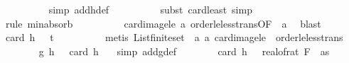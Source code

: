 \begin{isabellebody}
\ \ \ \ \ \ \ \ \isamarkupfalse%
\ {\isacharparenleft}{\kern0pt}simp\ add{\isacharcolon}{\kern0pt}h{\isacharunderscore}{\kern0pt}def{\isacharparenright}{\kern0pt}\isanewline
\ \ \ \ \ \ \ \ \isamarkupfalse%
\ {\isacharparenleft}{\kern0pt}subst\ card{\isacharunderscore}{\kern0pt}least{\isacharcomma}{\kern0pt}\ simp{\isacharparenright}{\kern0pt}\isanewline
\ \ \ \ \ \ \ \ \isamarkupfalse%
\ {\isacharparenleft}{\kern0pt}rule\ min{\isachardot}{\kern0pt}absorb{}{\isacharparenright}{\kern0pt}\isanewline
\ \ \ \ \ \ \ \ \isamarkupfalse%
\ card{\isacharunderscore}{\kern0pt}image{\isacharunderscore}{\kern0pt}le\ a{\isacharunderscore}{\kern0pt}{}\ order{\isacharunderscore}{\kern0pt}le{\isacharunderscore}{\kern0pt}less{\isacharunderscore}{\kern0pt}trans{\isacharbrackleft}{\kern0pt}OF\ {\isacharunderscore}{\kern0pt}\ a{\isacharunderscore}{\kern0pt}{}{\isacharbrackright}{\kern0pt}\ \isamarkupfalse%
\ blast\isanewline
\ \ \ \ \ \ \isamarkupfalse%
\ {\isachardoublequoteopen}card\ {\isacharparenleft}{\kern0pt}h\ {\isasymomega}{\isacharparenright}{\kern0pt}\ {\isacharless}{\kern0pt}\ t{\isachardoublequoteclose}\isanewline
\ \ \ \ \ \ \ \ \isamarkupfalse%
\ {\isacharparenleft}{\kern0pt}metis\ List{\isachardot}{\kern0pt}finite{\isacharunderscore}{\kern0pt}set\ \ a{\isacharunderscore}{\kern0pt}{}\ a{\isacharunderscore}{\kern0pt}{}\ card{\isacharunderscore}{\kern0pt}image{\isacharunderscore}{\kern0pt}le\ \ order{\isacharunderscore}{\kern0pt}le{\isacharunderscore}{\kern0pt}less{\isacharunderscore}{\kern0pt}trans{\isacharparenright}{\kern0pt}\isanewline
\ \ \ \ \ \ \isamarkupfalse%
\ {\isachardoublequoteopen}g{\isacharprime}{\kern0pt}\ {\isacharparenleft}{\kern0pt}h\ {\isasymomega}{\isacharparenright}{\kern0pt}\ {\isacharequal}{\kern0pt}\ card\ {\isacharparenleft}{\kern0pt}h\ {\isasymomega}{\isacharparenright}{\kern0pt}{\isachardoublequoteclose}\ \isamarkupfalse%
\ {\isacharparenleft}{\kern0pt}simp\ add{\isacharcolon}{\kern0pt}g{\isacharprime}{\kern0pt}{\isacharunderscore}{\kern0pt}def{\isacharparenright}{\kern0pt}\isanewline
\ \ \ \ \ \ \isamarkupfalse%
\ {\isachardoublequoteopen}card\ {\isacharparenleft}{\kern0pt}h\ {\isasymomega}{\isacharparenright}{\kern0pt}\ {\isasymnoteq}\ real{\isacharunderscore}{\kern0pt}of{\isacharunderscore}{\kern0pt}rat\ {\isacharparenleft}{\kern0pt}F\ {}\ as{\isacharparenright}{\kern0pt}{\isachardoublequoteclose}\isanewline

\end{isabellebody}
